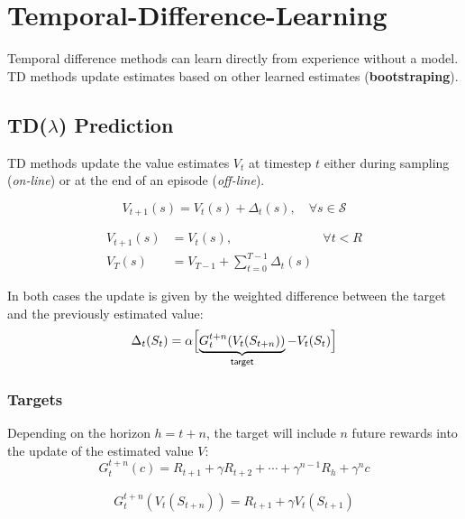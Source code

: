 \section{Temporal-Difference-Learning}
Temporal difference methods can learn directly from experience without a model.
TD methods update estimates based on other learned estimates (\textbf{bootstraping}).

\subsection[TD Prediction]{TD($\lambda$) Prediction} %
TD methods update the value estimates $V_t$ at timestep $t$ either during sampling (\textit{on-line}) or at the end of an episode (\textit{off-line}).

\newpar{}
\noindent\begin{equation*}
    V_{t+1}(s) = V_t(s)+\Delta_t(s),\quad \forall s\in \mathcal{S}
\end{equation*}

\newpar{}
\noindent\begin{align*}
    V_{t+1}(s) & = V_t(s),                                & \forall t < R \\
    V_T(s)     & = V_{T-1} + \sum_{t=0}^{T-1} \Delta_t(s)
\end{align*}

In both cases the update is given by the weighted difference between the target and the previously estimated value:
\noindent\begin{equation*}
    \Delta_t(S_t) = \alpha \Bigl[\underbrace{G_t^{t+n}(V_t(S_{t+n}))}_{\textsf{target}} -V_t(S_t) \Bigr]
\end{equation*}

\subsubsection{Targets}
Depending on the horizon $h=t+n$, the target will include $n$ future rewards into the update of the estimated value $V$:
\noindent\begin{equation*}
    G_t^{t+n}(c) = R_{t+1} + \gamma R_{t+2} + \cdots + \gamma^{n-1}R_{h} + \gamma^n c
\end{equation*}

\noindent\begin{align*}
    G_t^{t+n}(V_t(S_{t+n})) = R_{t+1} +  \gamma V_t(S_{t+1})
\end{align*}


